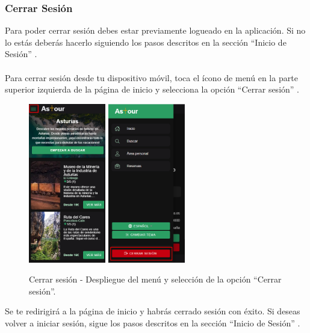 \subsubsection{Cerrar Sesión}
Para poder cerrar sesión debes estar previamente logueado en la aplicación. Si no lo estás deberás hacerlo siguiendo los pasos descritos en la sección “Inicio de Sesión” .
\\ \\[1ex]
Para cerrar sesión desde tu dispositivo móvil, toca el ícono de menú en la parte superior izquierda de la página de inicio y selecciona la opción “Cerrar sesión” .
\begin{figure}[H]
	\centering
	\includegraphics[width=0.3\textwidth]{7-Construccion/Manuales/mobile/menu marcado.png}
	\includegraphics[width=0.3\textwidth]{7-Construccion/Manuales/mobile/cerrar sesion marcado.png}
	\caption{Cerrar sesión - Despliegue del menú y selección de la opción “Cerrar sesión”.}
\end{figure}
Se te redirigirá a la página de inicio y habrás cerrado sesión con éxito. Si deseas volver a iniciar sesión, sigue los pasos descritos en la sección “Inicio de Sesión” .

